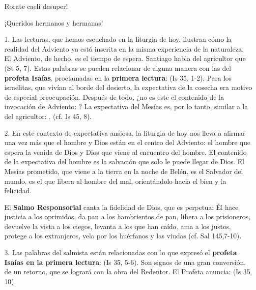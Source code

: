 				\begin{body}
					Rorate caeli desuper!
					
					¡Queridos hermanos y hermanas!
					
					1. Las lecturas, que hemos escuchado en la liturgia de hoy, ilustran cómo la realidad del Adviento ya está inscrita en la misma experiencia de la naturaleza. El Adviento, de hecho, es el tiempo de espera. Santiago habla del agricultor que  (St 5, 7). Estas palabras se pueden relacionar de alguna manera con las del \textbf{profeta Isaías}, proclamadas en la \textbf{primera lectura}:  (Is 35, 1-2). Para los israelitas, que vivían al borde del desierto, la expectativa de la cosecha era motivo de especial preocupación. Después de todo, ¿no es este el contenido de la invocación de Adviento: ? La expectativa del Mesías es, por lo tanto, similar a la del agricultor: ,  (cf. Is 45, 8).
					
					2. En este contexto de expectativa ansiosa, la liturgia de hoy nos lleva a afirmar una vez más que el hombre y Dios están en el centro del Adviento: el hombre que espera la venida de Dios y Dios que viene al encuentro del hombre. El contenido de la expectativa del hombre es la salvación que solo le puede llegar de Dios. El Mesías prometido, que viene a la tierra en la noche de Belén, es el Salvador del mundo, es el que libera al hombre del mal, orientándolo hacia el bien y la felicidad.
					
					El \textbf{Salmo Responsorial} canta la fidelidad de Dios, que es perpetua: Él hace justicia a los oprimidos, da pan a los hambrientos de pan, libera a los prisioneros, devuelve la vista a los ciegos, levanta a los que han caído, ama a los justos, protege a los extranjeros, vela por los huérfanos y las viudas (cf. Sal 145,7-10).
					
					3. Las palabras del salmista están relacionadas con lo que expresó el \textbf{profeta Isaías en la primera lectura}:  (Is 35, 5-6). Son signos de una gran conversión, de un retorno, que se logrará con la obra del Redentor. El Profeta anuncia:  (Is 35, 10).
					

\end{body}
